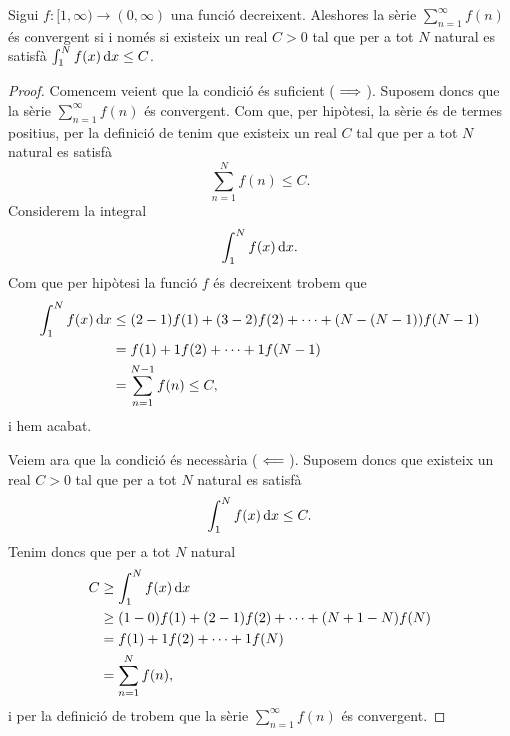 \documentclass[../../Main.tex]{subfiles}
\begin{document}
	\begin{lemma}
		\label{lema:criteri de la integral}
		Sigui \(f\colon[1,\infty)\longrightarrow(0,\infty)\) una funció decreixent. Aleshores la sèrie \(\sum_{n=1}^{\infty}f(n)\) és convergent si i només si existeix un real \(C>0\) tal que per a tot \(N\) natural es satisfà \(\int_{1}^{N}f(x)\mathop{}\!\mathrm{d} x\leq C\).
		\begin{proof}
			Comencem veient que la condició és suficient (\(\implies\)). Suposem doncs que la sèrie \(\sum_{n=1}^{\infty}f(n)\) és convergent. Com que, per hipòtesi, la sèrie és de termes positius, per la definició de  tenim que existeix un real \(C\) tal que per a tot \(N\) natural es satisfà
			\[\sum_{n=1}^{N}f(n)\leq C.\]
			Considerem la integral
			\[\int_{1}^{N}f(x)\mathop{}\!\mathrm{d} x.\]
			Com que per hipòtesi la funció \(f\) és decreixent trobem que
			\begin{align*}
				\int_{1}^{N}f(x)\mathop{}\!\mathrm{d} x&\leq(2-1)f(1)+(3-2)f(2)+\dots+(N-(N-1))f(N-1)\\
				&=f(1)+1f(2)+\dots+1f(N-1)\\
				&=\sum_{n=1}^{N-1}f(n)\leq C,
			\end{align*}
			i hem acabat.
			
			Veiem ara que la condició és necessària (\(\impliedby\)). Suposem doncs que existeix un real \(C>0\) tal que per a tot \(N\) natural es satisfà
			\[\int_{1}^{N}f(x)\mathop{}\!\mathrm{d} x\leq C.\]
			Tenim doncs que per a tot \(N\) natural
			\begin{align*}
				C&\geq\int_{1}^{N}f(x)\mathop{}\!\mathrm{d} x \\
				&\geq(1-0)f(1)+(2-1)f(2)+\dots+(N+1-N)f(N) \\
				&=f(1)+1f(2)+\dots+1f(N) \\
				&=\sum_{n=1}^{N}f(n),
			\end{align*}
			i per la definició de  trobem que la sèrie \(\sum_{n=1}^{\infty}f(n)\) és convergent.
		\end{proof}
	\end{lemma}
\end{document}
